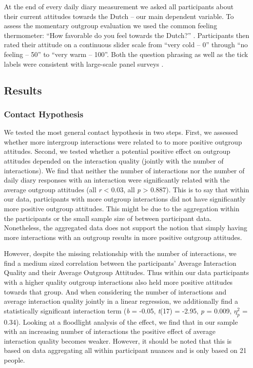 At the end of every daily diary measurement we asked all participants
about their current attitudes towards the Dutch -- our main dependent
variable. To assess the momentary outgroup evaluation we used the common
feeling thermometer: ``How favorable do you feel towards the Dutch?''
\citep[][]{Lavrakas2008}. Participants then rated their attitude on a
continuous slider scale from ``very cold -- 0'' through ``no feeling --
50'' to ``very warm -- 100''. Both the question phrasing as well as the
tick labels were consistent with large-scale panel surveys
\citep[e.g.,][]{DeBell2010}.

\subsection{Results}

\subsubsection{Contact Hypothesis}

We tested the most general contact hypothesis in two steps. First, we
assessed whether more intergroup interactions were related to to more
positive outgroup attitudes. Second, we tested whether a potential
positive effect on outgroup attitudes depended on the interaction
quality (jointly with the number of interactions). We find that neither
the number of interactions nor the number of daily diary responses with
an interaction were significantly related with the average outgroup
attitudes (all \textbar{} \textit{r} \textbar{} \textless{} 0.03, all
\textit{p} \textgreater{} 0.887). This is to say that within our data,
participants with more outgroup interactions did not have significantly
more positive outgroup attitudes. This might be due to the aggregation
within the participants or the small sample size of between participant
data. Nonetheless, the aggregated data does not support the notion that
simply having more interactions with an outgroup results in more
positive outgroup attitudes.

However, despite the missing relationship with the number of
interactions, we find a medium sized correlation between the
participants' Average Interaction Quality and their Average Outgroup
Attitudes. Thus within our data participants with a higher quality
outgroup interactions also held more positive attitudes towards that
group. And when considering the number of interactions and average
interaction quality jointly in a linear regression, we additionally find
a statistically significant interaction term (\textit{b} = -0.05,
\textit{t}(17) = -2.95, \textit{p} = 0.009, \(\eta_p^2\) = 0.34).
Looking at a floodlight analysis of the effect, we find that in our
sample with an increasing number of interactions the positive effect of
average interaction quality becomes weaker. However, it should be noted
that this is based on data aggregating all within participant nuances
and is only based on 21 people.

